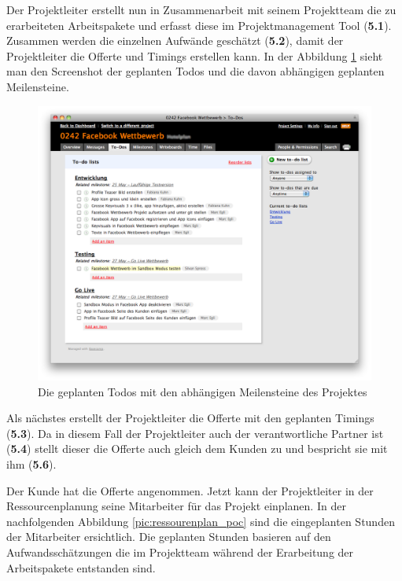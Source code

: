 Der Projektleiter erstellt nun in Zusammenarbeit mit seinem Projektteam die
zu erarbeiteten Arbeitspakete und erfasst diese im Projektmanagement Tool (\textbf{5.1}).
Zusammen werden die einzelnen Aufwände geschätzt (\textbf{5.2}), damit der 
Projektleiter die Offerte und Timings erstellen kann. In der
Abbildung \ref{pic:todos_poc} sieht man den Screenshot der geplanten Todos und die davon
abhängigen geplanten Meilensteine.

\begin{figure}[htbp]
\begin{center}
\includegraphics[width=1.0\textwidth,angle=0]{./bilder/proof_of_concept/todos_poc.png}
\caption[Die geplanten Todos mit den abhängigen Meilensteine des Projektes]{Die geplanten Todos 
    mit den abhängigen Meilensteine des Projektes\footnotemark}
\label{pic:todos_poc}
\end{center}
\end{figure}

Als nächstes erstellt der Projektleiter die Offerte mit den geplanten Timings
(\textbf{5.3}). Da in diesem Fall der Projektleiter auch der verantwortliche
Partner ist (\textbf{5.4}) stellt dieser die Offerte auch gleich dem Kunden zu und bespricht
sie mit ihm (\textbf{5.6}).

Der Kunde hat die Offerte angenommen. Jetzt kann der Projektleiter in der 
Ressourcenplanung seine Mitarbeiter für das Projekt einplanen. In der nachfolgenden
Abbildung \ref{pic:ressourenplan_poc} sind die eingeplanten Stunden der Mitarbeiter
ersichtlich. Die geplanten Stunden basieren auf den Aufwandsschätzungen die im
Projektteam während der Erarbeitung der Arbeitspakete entstanden sind.

